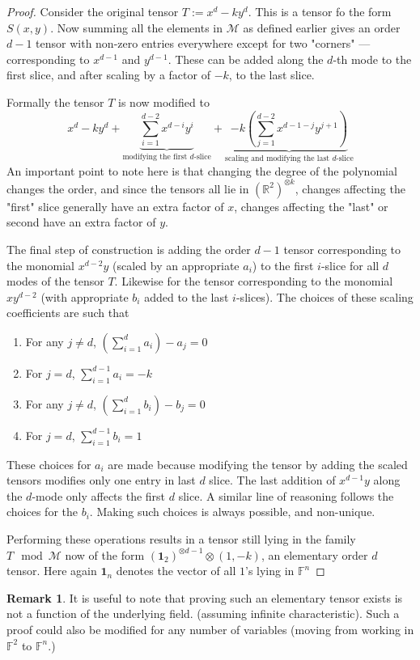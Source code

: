 \documentclass[12pt,a4paper,oneside]{book}
\def\reals{\mathbb{R}} %
\def\field{\mathbb{F}} %
\theoremstyle{definition}
\newtheorem*{remark}{Remark}
\begin{document}
\begin{proof}
    Consider the original tensor $T := x^d - ky^d$. This is a tensor fo the form $S(x,y)$. Now summing all the elements in $\mathcal{M}$ as defined earlier gives an order $d-1$ tensor with non-zero entries everywhere except for two "corners" --- corresponding to $x^{d-1}$ and $y^{d-1}$. These can be added along the $d$-th mode to the first slice, and after scaling by a factor of $-k$, to the last slice.
   
    Formally the tensor $T$ is now modified to $$x^d - ky^d + \underbrace{\sum_{i=1}^{d-2} x^{d-i}y^i}_{\text{modifying the first $d$-slice}} + \underbrace{-k\left(\sum_{j=1}^{d-2} x^{d-1-j}y^{j+1}\right)}_{\text{scaling and modifying the last $d$-slice}}$$An important point to note here is that changing the degree of the polynomial changes the order, and since the tensors all lie in $(\reals^2)^{\otimes k}$, changes affecting the "first" slice generally have an extra factor of $x$, changes affecting the "last" or second have an extra factor of $y$.

    The final step of construction is adding the order $d-1$ tensor corresponding to the monomial $x^{d-2}y$ (scaled by an appropriate $a_i$) to the first $i$-slice for all $d$ modes of the tensor $T$. Likewise for the tensor corresponding to the monomial $xy^{d-2}$ (with appropriate $b_i$ added to the last $i$-slices). The choices of these scaling coefficients are such that \begin{enumerate}
        \item For any $j \neq d$, $(\sum_{i=1}^{d} a_i) - a_j = 0$
        \item For $j = d$, $\sum_{i=1}^{d-1} a_i  = -k$
        \item For any $j \neq d$, $(\sum_{i=1}^{d} b_i) - b_j = 0$
        \item For $j = d$, $\sum_{i=1}^{d-1} b_i  = 1$
    \end{enumerate}
    These choices for $a_i$ are made because modifying the tensor by adding the scaled tensors modifies only one entry in last $d$ slice. The last addition of $x^{d-1}y$ along the $d$-mode only affects the first $d$ slice. A similar line of reasoning follows the choices for the $b_i$. Making such choices is always possible, and non-unique.

    Performing these operations results in a tensor still lying in the family $T\mod \mathcal{M}$ now of the form $(\mathbf{1}_2)^{\otimes d-1} \otimes (1, -k)$, an elementary order $d$ tensor. Here again $\mathbf{1}_n$ denotes the vector of all $1$'s lying in $\field^n$
\end{proof}
\begin{remark}
    It is useful to note that proving such an elementary tensor exists is not a function of the underlying field. (assuming infinite characteristic). Such a proof could also be modified for any number of variables (moving from working in $\field^2$ to $\field^n$.)
\end{remark}
\end{document}
